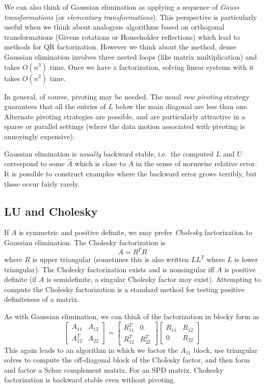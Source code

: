 \documentclass[12pt, leqno]{article}
\begin{document}
We can also think of Gaussian elimination as applying a sequence of
{\em Gauss transformations} (or {\em elementary transformations}).
This perspective is particularly useful when we think about analogous
algorithms based on orthogonal transformations (Givens rotations or
Householder reflections) which lead to methods for QR factorization.
However we think about the method, dense Gaussian elimination involves
three nested loops (like matrix multiplication) and takes $O(n^3)$
time.  Once we have a factorization, solving linear systems with it
takes $O(n^2)$ time.

In general, of course, pivoting may be needed.  The usual
{\em row pivoting} strategy guarantees that all the entries of $L$ below the
main diagonal are less than one.  Alternate pivoting strategies are
possible, and are particularly attractive in a sparse or parallel
settings (where the data motion associated with pivoting is annoyingly
expensive).

Gaussian elimination is {\em usually} backward stable, i.e.~the
computed $L$ and $U$ correspond to some $\hat{A}$ which is close to
$A$ in the sense of normwise relative error.  It is possible
to construct examples where the backward error grows terribly,
but these occur fairly rarely.

\subsection{LU and Cholesky}

If $A$ is symmetric and positive definite, we may prefer {\em
  Cholesky} factorization to Gaussian elimination.  The Cholesky
factorization is
\[
  A = R^T R
\]
where $R$ is upper triangular (sometimes this is also written $LL^T$
where $L$ is lower triangular).  The Cholesky factorization exists
and is nonsingular iff $A$ is positive definite (if $A$ is
semidefinite, a singular Cholesky factor may exist).  Attempting
to compute the Cholesky factorization is a standard method for testing
positive definiteness of a matrix.

As with Gaussian elimination, we can think of the factorization in
blocky form as
\[
  \begin{bmatrix}
    A_{11} & A_{12} \\
    A_{12}^T & A_{22}
  \end{bmatrix} =
  \begin{bmatrix}
    R_{11}^T & 0 \\
    R_{12}^T & R_{22}^T
  \end{bmatrix}
  \begin{bmatrix}
    R_{11} & R_{12} \\
    0 & R_{22}
  \end{bmatrix}
\]
This again leads to an algorithm in which we factor the $A_{11}$
block, use triangular solves to compute the off-diagonal block of the
Cholesky factor, and then form and factor a Schur complement matrix.
For an SPD matrix, Chokesky factorization is backward stable even
without pivoting.
\end{document}
